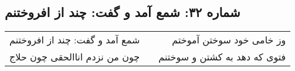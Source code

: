 \begin{center}
\section*{شماره ۳۲: شمع آمد و گفت: چند از افروختنم}
\label{sec:032}
\begin{longtable}{l p{0.5cm} r}
شمع آمد و گفت: چند از افروختنم
&&
وز خامی خود سوختن آموختم
\\
چون من نزدم اناالحقی چون حلاج
&&
فتوی که دهد به کشتن و سوختنم
\\
\end{longtable}
\end{center}

